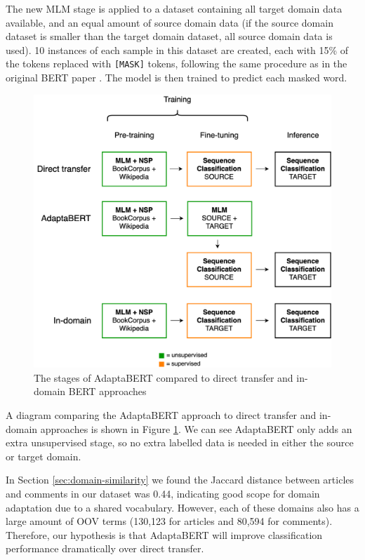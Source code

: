 The new MLM stage is applied to a dataset containing all target domain data available, and an equal amount of source domain data (if the source domain dataset is smaller than the target domain dataset, all source domain data is used). 10 instances of each sample in this dataset are created, each with 15\% of the tokens replaced with \texttt{[MASK]} tokens, following the same procedure as in the original BERT paper \cite{bert}. The model is then trained to predict each masked word.

\begin{figure}[ht]
    \centering
    \hspace{-1.5cm}
    \includegraphics[scale=0.29]{0-img/adaptabert.png}
    \caption{The stages of AdaptaBERT compared to direct transfer and in-domain BERT approaches}
    \label{fig:adaptabert}
\end{figure}

A diagram comparing the AdaptaBERT approach to direct transfer and in-domain approaches is shown in Figure \ref{fig:adaptabert}. We can see AdaptaBERT only adds an extra unsupervised stage, so no extra labelled data is needed in either the source or target domain.

In Section \ref{sec:domain-similarity} we found the Jaccard distance between articles and comments in our dataset was 0.44, indicating good scope for domain adaptation due to a shared vocabulary. However, each of these domains also has a large amount of OOV terms (130,123 for articles and 80,594 for comments). Therefore, our hypothesis is that AdaptaBERT will improve classification performance dramatically over direct transfer.

